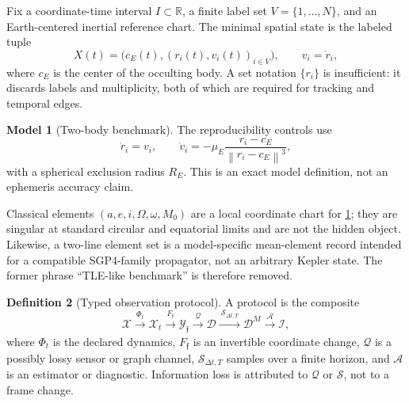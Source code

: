 \documentclass[11pt,a4paper]{article}
\theoremstyle{definition}
\newtheorem{definition}{Definition}[section]
\newtheorem{model}[definition]{Model}
\theoremstyle{plain}
\theoremstyle{remark}
\newcommand{\R}{\mathbb{R}}
\newcommand{\norm}[1]{\left\lVert #1\right\rVert}
\newcommand{\Xcal}{\mathcal X}
\newcommand{\Ycal}{\mathcal Y}
\newcommand{\Qcal}{\mathcal Q}
\newcommand{\Scal}{\mathcal S}
\newcommand{\Acal}{\mathcal A}
\newcommand{\Ical}{\mathcal I}
\begin{document}
Fix a coordinate-time interval \(I\subset\R\), a finite label set
\(V=\{1,\ldots,N\}\), and an Earth-centered inertial reference chart.
The minimal spatial state is the labeled tuple
\begin{equation}\label{eq:hidden-state}
X(t)=\bigl(c_E(t),(r_i(t),v_i(t))_{i\in V}\bigr),
\qquad v_i=\dot r_i ,
\end{equation}
where \(c_E\) is the center of the occulting body.  A set notation
\(\{r_i\}\) is insufficient: it discards labels and multiplicity, both
of which are required for tracking and temporal edges.

\begin{model}[Two-body benchmark]
\label{model:two-body}
The reproducibility controls use
\begin{equation}\label{eq:two-body}
\dot r_i=v_i,\qquad
\dot v_i=-\mu_E\frac{r_i-c_E}{\norm{r_i-c_E}^{3}},
\end{equation}
with a spherical exclusion radius \(R_E\).  This is an exact model
definition, not an ephemeris accuracy claim.
\end{model}

Classical elements \((a,e,i,\Omega,\omega,M_0)\) are a local
coordinate chart for \cref{model:two-body}; they are singular at
standard circular and equatorial limits and are not the hidden object.
Likewise, a two-line element set is a model-specific mean-element
record intended for a compatible SGP4-family propagator, not an
arbitrary Kepler state.  The former phrase ``TLE-like benchmark'' is
therefore removed.

\begin{definition}[Typed observation protocol]
A protocol is the composite
\begin{equation}\label{eq:chain}
\Xcal
\xrightarrow{\ \Phi_t\ }\Xcal_t
\xrightarrow{\ F_{\mathfrak f}\ }\Ycal_{\mathfrak f}
\xrightarrow{\ \Qcal\ }\mathcal D
\xrightarrow{\ \Scal_{\Delta t,T}\ }\mathcal D^M
\xrightarrow{\ \Acal\ }\Ical ,
\end{equation}
where \(\Phi_t\) is the declared dynamics,
\(F_{\mathfrak f}\) is an invertible coordinate change,
\(\Qcal\) is a possibly lossy sensor or graph channel,
\(\Scal_{\Delta t,T}\) samples over a finite horizon, and
\(\Acal\) is an estimator or diagnostic.  Information loss is
attributed to \(\Qcal\) or \(\Scal\), not to a frame change.
\end{definition}
\end{document}
